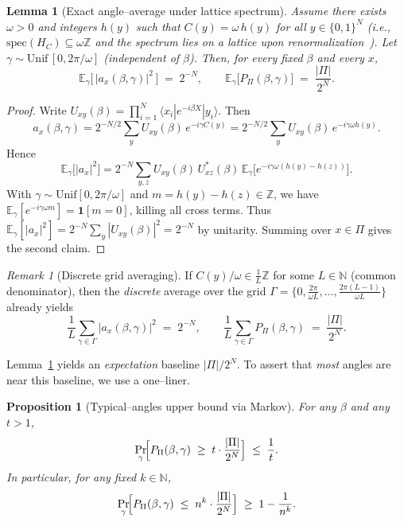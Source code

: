 \documentclass[a4paper,onecolumn,11pt,unpublished]{quantumarticle}
\newtheorem{lemma}[theorem]{Lemma}
\newtheorem{proposition}[theorem]{Proposition}
\theoremstyle{remark}
\newtheorem{remark}[theorem]{Remark}
\begin{document}
\begin{lemma}[Exact angle–average under lattice spectrum]
\label{lem:avg-gamma-lattice}
Assume there exists $\omega>0$ and integers $h(y)$ such that $C(y)=\omega\,h(y)$
for all $y\in\{0,1\}^N$ (i.e., $\mathrm{spec}(H_C)\subseteq \omega\mathbb Z$ and the spectrum lies on a lattice  upon renormalization~\cite{montanezbarrera2024universalqaoa}).
Let $\gamma\sim \mathrm{Unif}\,[0,2\pi/\omega]$ (independent of $\beta$). Then, for every fixed $\beta$ and every $x$,
\[
  \mathbb{E}_{\gamma}\bigl[\,|a_x(\beta,\gamma)|^2\,\bigr] \;=\; 2^{-N},
  \qquad
  \mathbb{E}_{\gamma}\bigl[P_{\Pi}(\beta,\gamma)\bigr] \;=\; \frac{|\Pi|}{2^{N}}.
\]
\end{lemma}

\begin{proof}
Write $U_{xy}(\beta)=\prod_{i=1}^{N}\langle x_i|e^{-i\beta X}|y_i\rangle$.
Then
\[
  a_x(\beta,\gamma)
  = 2^{-N/2}\sum_y U_{xy}(\beta)\,e^{-i\gamma C(y)}
  = 2^{-N/2}\sum_y U_{xy}(\beta)\,e^{-i\gamma\omega h(y)}.
\]
Hence
\begin{equation}
\label{eq:angle-avg}
  \mathbb{E}_{\gamma}\bigl[|a_x|^2\bigr]
  = 2^{-N}\!\sum_{y,z} U_{xy}(\beta)\,U^*_{xz}(\beta)\,
     \mathbb{E}_{\gamma}\!\bigl[e^{-i\gamma\omega(h(y)-h(z))}\bigr].
\end{equation}
With $\gamma\sim\mathrm{Unif}[0,2\pi/\omega]$ and $m=h(y)-h(z)\in\mathbb Z$, we have
$\mathbb{E}_\gamma[e^{-i\gamma\omega m}]=\mathbf{1}[m=0]$, killing all cross terms.
Thus $\mathbb{E}_\gamma[|a_x|^2]=2^{-N}\sum_y |U_{xy}(\beta)|^2=2^{-N}$ by unitarity.
Summing over $x\in\Pi$ gives the second claim.
\end{proof}

\begin{remark}[Discrete grid averaging]
\label{rem:discrete-grid}
If $C(y)/\omega\in \tfrac{1}{L}\mathbb Z$ for some $L\in\mathbb N$ (common denominator),
then the \emph{discrete} average over the grid
$\Gamma=\{0,\tfrac{2\pi}{\omega L},\dots,\tfrac{2\pi(L-1)}{\omega L}\}$ already yields
\[
  \frac{1}{L}\sum_{\gamma\in\Gamma} |a_x(\beta,\gamma)|^2 \;=\; 2^{-N},
  \qquad
  \frac{1}{L}\sum_{\gamma\in\Gamma} P_\Pi(\beta,\gamma) \;=\; \frac{|\Pi|}{2^N}.
\]
\end{remark}

Lemma~\ref{lem:avg-gamma-lattice} yields an \emph{expectation} baseline
$|\Pi|/2^N$. To assert that \emph{most} angles are near this baseline, we use
a one–liner.

\begin{proposition}[Typical–angles upper bound via Markov]
\label{prop:markov}
For any $\beta$ and any $t>1$,
\[
  \Pr_{\gamma}\!\Bigl[P_{\Pi}(\beta,\gamma)\;\ge\; t\cdot \frac{|\Pi|}{2^{N}}\Bigr]
  \;\le\; \frac{1}{t}.
\]
In particular, for any fixed $k\in\mathbb{N}$,
\[
  \Pr_{\gamma}\!\Bigl[P_{\Pi}(\beta,\gamma)\;\le\; n^{k}\cdot \frac{|\Pi|}{2^{N}}\Bigr]
  \;\ge\; 1-\frac{1}{n^{k}}.
\]
\end{proposition}
\end{document}

